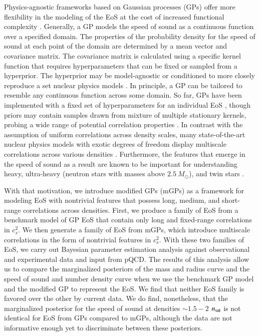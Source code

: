\documentclass[aps,prd,nofootinbib,tightenlines,notitlepage,floatfix,superscriptaddress,showkeys,twocolumn]{revtex4-1}
\begin{document}
Physics-agnostic frameworks based on Gaussian processes (GPs) offer more flexibility in the modeling of the EoS at the cost of increased functional complexity \cite{Landry:2018prl,Han:2021kjx,Legred:2021hdx,Landry:2020vaw,Essick:2019ldf}. Generally, a GP models the speed of sound as a continuous function over a specified domain. The properties of the probability density for the speed of sound at each point of the domain are determined by a mean vector and covariance matrix. The covariance matrix is calculated using a specific kernel function that requires hyperparameters that can be fixed or sampled from a hyperprior. The hyperprior may be model-agnostic or conditioned to more closely reproduce a set nuclear physics models \cite{Essick:2019ldf}. 
In principle, a GP can be tailored to resemble any continuous function across some domain. So far, GPs have been implemented with a fixed set of hyperparameters for an individual EoS \cite{Landry:2018prl,Han:2021kjx,Legred:2021hdx,Landry:2020vaw,Essick:2019ldf,Miller:2021qha,Riley:2021pdl,Gorda:2022jvk,Annala:2023cwx}, though priors may contain samples drawn from mixture of multiple stationary kernels, probing a wide range of potential correlation properties \cite{Legred:2021hdx,Essick:2019ldf}. In contrast with the assumption of uniform correlations across density scales, many state-of-the-art nuclear physics models with exotic degrees of freedom display multiscale correlations across various densities \cite{Tan:2020ics}. Furthermore, the features that emerge in the speed of sound as a result are known to be important for understanding heavy, ultra-heavy (neutron stars with masses above $2.5\ M_\odot$), and twin stars \cite{Tan:2021ahl,Tan:2021nat,Tan:2020ics}. 

With that motivation, we introduce modified GPs (mGPs) as a framework for modeling EoS with nontrivial features that possess long, medium, and short-range correlations across densities. First, we produce a family of EoS from a benchmark model of GP EoS that contain only long and fixed-range correlations in $c_s^2$. We then generate a family of EoS from mGPs, which introduce multiscale correlations in the form of nontrivial features in $c_s^2$. With these two families of EoS, we carry out Bayesian parameter estimation analysis against  observational and experimental data and input from pQCD. The results of this analysis allow us to compare the marginalized posteriors of the mass and radius curve and the speed of sound and number density curve when we use the benchmark GP model and the modified GP to represent the EoS. We find that neither EoS family is favored over the other by current data. We do find, nonetheless, that the marginalized posterior for the speed of sound at densities $\sim 1.5-2$ $n_{\rm sat}$ is not identical for EoS from GPs compared to mGPs, although the data are not informative enough yet to discriminate between these posteriors. 
\end{document}
